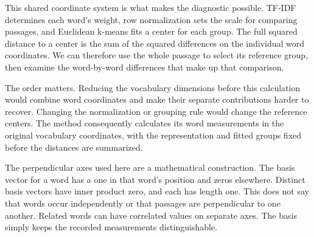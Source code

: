 \documentclass[10pt,letterpaper]{article}
\begin{document}
This shared coordinate system is what makes the diagnostic possible. TF-IDF determines each word's weight, row normalization sets the scale for comparing passages, and Euclidean k-means fits a center for each group. The full squared distance to a center is the sum of the squared differences on the individual word coordinates. We can therefore use the whole passage to select its reference group, then examine the word-by-word differences that make up that comparison.\par

The order matters. Reducing the vocabulary dimensions before this calculation would combine word coordinates and make their separate contributions harder to recover. Changing the normalization or grouping rule would change the reference centers. The method consequently calculates its word measurements in the original vocabulary coordinates, with the representation and fitted groups fixed before the distances are summarized.\par

The perpendicular axes used here are a mathematical construction. The basis vector for a word has a one in that word's position and zeros elsewhere. Distinct basis vectors have inner product zero, and each has length one. This does not say that words occur independently or that passages are perpendicular to one another. Related words can have correlated values on separate axes. The basis simply keeps the recorded measurements distinguishable.\par
\end{document}
